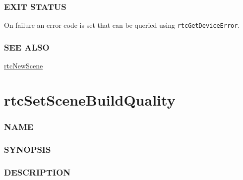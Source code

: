 \subsubsection{EXIT STATUS}\label{exit-status}

On failure an error code is set that can be queried using
\texttt{rtcGetDeviceError}.

\subsubsection{SEE ALSO}\label{see-also}

\hyperref[rtcnewscene]{rtcNewScene}

\pagebreak

\section{rtcSetSceneBuildQuality}\label{rtcsetscenebuildquality}

\subsubsection{NAME}\label{name}

\begin{Shaded}
\begin{Highlighting}[]
\OperatorTok{{-}}
\end{Highlighting}
\end{Shaded}

\subsubsection{SYNOPSIS}\label{synopsis}

\begin{Shaded}
\begin{Highlighting}[]

\OperatorTok{(}
\OperatorTok{,}
\OperatorTok{);}
\end{Highlighting}
\end{Shaded}

\subsubsection{DESCRIPTION}\label{description}

